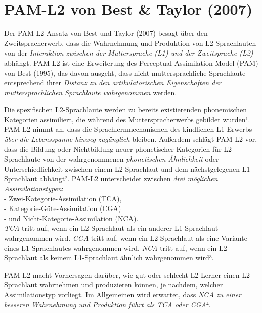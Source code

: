 \documentclass[
  letterpaper,
]{scrbook}
\begin{document}
\hypertarget{pam-l2-von-best-taylor-2007}{%
\section{PAM-L2 von Best \& Taylor
(2007)}\label{pam-l2-von-best-taylor-2007}}

Der PAM-L2-Ansatz von Best und Taylor (2007) besagt über den
Zweitspracherwerb, dass die Wahrnehmung und Produktion von
L2-Sprachlauten von der \emph{Interaktion zwischen der Muttersprache
(L1) und der Zweitsprache (L2)} abhängt. PAM-L2 ist eine Erweiterung des
Perceptual Assimilation Model (PAM) von Best (1995), das davon ausgeht,
dass nicht-muttersprachliche Sprachlaute entsprechend ihrer
\emph{Distanz zu den artikulatorischen Eigenschaften der
muttersprachlichen Sprachlaute wahrgenommen} werden.

Die spezifischen L2-Sprachlaute werden zu bereits existierenden
phonemischen Kategorien assimiliert, die während des Mutterspracherwerbs
gebildet wurden¹. PAM-L2 nimmt an, dass die Sprachlernmechanismen des
kindlichen L1-Erwerbs \emph{über die Lebensspanne hinweg zugänglich}
bleiben. Außerdem schlägt PAM-L2 vor, dass die Bildung oder Nichtbildung
neuer phonetischer Kategorien für L2-Sprachlaute von der wahrgenommenen
\emph{phonetischen Ähnlichkeit} oder Unterschiedlichkeit zwischen einem
L2-Sprachlaut und dem nächstgelegenen L1-Sprachlaut abhängt². PAM-L2
unterscheidet zwischen \emph{drei möglichen Assimilationstypen}:\\
- Zwei-Kategorie-Assimilation (TCA),\\
- Kategorie-Güte-Assimilation (CGA)\\
- und Nicht-Kategorie-Assimilation (NCA).\\
\emph{TCA} tritt auf, wenn ein L2-Sprachlaut als ein anderer
L1-Sprachlaut wahrgenommen wird. \emph{CGA} tritt auf, wenn ein
L2-Sprachlaut als eine Variante eines L1-Sprachlautes wahrgenommen wird.
\emph{NCA} tritt auf, wenn ein L2-Sprachlaut als keinem L1-Sprachlaut
ähnlich wahrgenommen wird³.

PAM-L2 macht Vorhersagen darüber, wie gut oder schlecht L2-Lerner einen
L2-Sprachlaut wahrnehmen und produzieren können, je nachdem, welcher
Assimilationstyp vorliegt. Im Allgemeinen wird erwartet, dass \emph{NCA
zu einer besseren Wahrnehmung und Produktion führt als TCA oder CGA}⁴.
\end{document}
